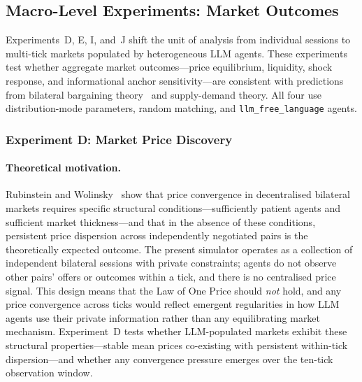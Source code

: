 
\subsection{Macro-Level Experiments: Market Outcomes}
\label{sec:exp-macro}

Experiments~D, E, I, and~J shift the unit of analysis from individual sessions to multi-tick markets populated by heterogeneous LLM agents.  These experiments test whether aggregate market outcomes---price equilibrium, liquidity, shock response, and informational anchor sensitivity---are consistent with predictions from bilateral bargaining theory~\cite{rubinstein1985} and supply-demand theory.  All four use distribution-mode parameters, random matching, and \texttt{llm\_free\_language} agents.

\subsubsection{Experiment D: Market Price Discovery}
\label{sec:exp-market}

\paragraph{Theoretical motivation.}
Rubinstein and Wolinsky~\cite{rubinstein1985} show that price convergence in decentralised bilateral markets requires specific structural conditions---sufficiently patient agents and sufficient market thickness---and that in the absence of these conditions, persistent price dispersion across independently negotiated pairs is the theoretically expected outcome.  The present simulator operates as a collection of independent bilateral sessions with private constraints; agents do not observe other pairs' offers or outcomes within a tick, and there is no centralised price signal.  This design means that the Law of One Price should \emph{not} hold, and any price convergence across ticks would reflect emergent regularities in how LLM agents use their private information rather than any equilibrating market mechanism.  Experiment~D tests whether LLM-populated markets exhibit these structural properties---stable mean prices co-existing with persistent within-tick dispersion---and whether any convergence pressure emerges over the ten-tick observation window.

